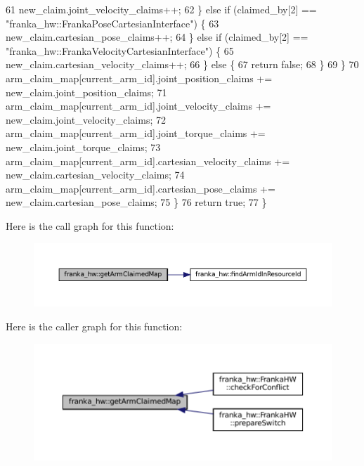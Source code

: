 \begin{DoxyCode}
61         new\_claim.joint\_velocity\_claims++;
62       \} \textcolor{keywordflow}{else} \textcolor{keywordflow}{if} (claimed\_by[2] == \textcolor{stringliteral}{"franka\_hw::FrankaPoseCartesianInterface"}) \{
63         new\_claim.cartesian\_pose\_claims++;
64       \} \textcolor{keywordflow}{else} \textcolor{keywordflow}{if} (claimed\_by[2] == \textcolor{stringliteral}{"franka\_hw::FrankaVelocityCartesianInterface"}) \{
65         new\_claim.cartesian\_velocity\_claims++;
66       \} \textcolor{keywordflow}{else} \{
67         \textcolor{keywordflow}{return} \textcolor{keyword}{false};
68       \}
69     \}
70     arm\_claim\_map[current\_arm\_id].joint\_position\_claims += new\_claim.joint\_position\_claims;
71     arm\_claim\_map[current\_arm\_id].joint\_velocity\_claims += new\_claim.joint\_velocity\_claims;
72     arm\_claim\_map[current\_arm\_id].joint\_torque\_claims += new\_claim.joint\_torque\_claims;
73     arm\_claim\_map[current\_arm\_id].cartesian\_velocity\_claims += new\_claim.cartesian\_velocity\_claims;
74     arm\_claim\_map[current\_arm\_id].cartesian\_pose\_claims += new\_claim.cartesian\_pose\_claims;
75   \}
76   \textcolor{keywordflow}{return} \textcolor{keyword}{true};
77 \}
\end{DoxyCode}
Here is the call graph for this function\+:
\nopagebreak
\begin{figure}[H]
\begin{center}
\leavevmode
\includegraphics[width=350pt]{namespacefranka__hw_af08f089686416ffb7904fbe86f19b8a9_cgraph}
\end{center}
\end{figure}
Here is the caller graph for this function\+:
\nopagebreak
\begin{figure}[H]
\begin{center}
\leavevmode
\includegraphics[width=350pt]{namespacefranka__hw_af08f089686416ffb7904fbe86f19b8a9_icgraph}
\end{center}
\end{figure}
\mbox{\label{namespacefranka__hw_a21fc3cb90700f7fc2b9b9a93c2d40d0a}} 

